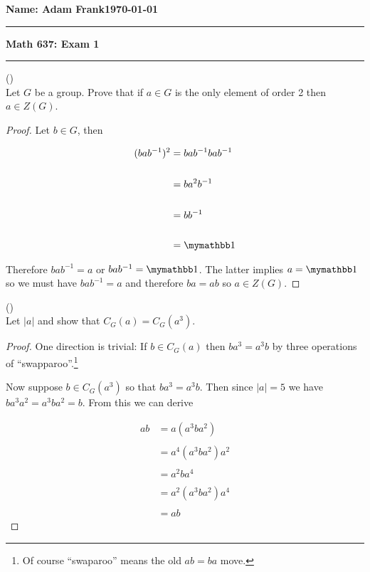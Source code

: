\documentclass{exam}
\begin{document}
\noindent \textbf{Name: Adam Frank}\hfill \textbf{\today}

\vspace{.3cm}
\hrule
\begin{center}
{\bf \Large{Math 637: Exam 1}}
\end{center}
\hrule
\vspace{.3cm}


\begin{questions}
\question()\\
Let $G$ be a group.  Prove that if $a\in G$ is the only element of order 2 then $a\in Z(G)$.

\begin{proof}
  Let $b\in G$, then

\begin{align*}
  (bab^{-1})^2 &= bab^{-1}bab^{-1} \\\\
  &= ba^2b^{-1} \\\\
  &= bb^{-1} \\\\
  &= \mymathbb 1
\end{align*}

Therefore $bab^{-1}=a$ or $bab^{-1}=\mymathbb 1$.  The latter implies $a=\mymathbb 1$ so we must have $bab^{-1}=a$ and therefore $ba=ab$ so $a\in Z(G)$.

\end{proof}

\vspace{1cm}

\question()\\
Let $|a|$ and show that $C_G(a)=C_G(a^3)$.

\begin{proof}
  One direction is trivial:  If $b\in C_G(a)$ then $ba^3 = a^3b$ by three operations of ``swapparoo''.\footnote{Of course ``swaparoo'' means the old $ab=ba$ move.}

  Now suppose $b\in C_G(a^3)$ so that $ba^3=a^3b$.  Then since $|a|=5$ we have $ba^3a^2=a^3ba^2=b$.  From this we can derive

  \begin{align*}
    ab &= a(a^3ba^2)\\\\
    &=a^4(a^3ba^2)a^2 \\\\
    &=a^2ba^4 \\\\
    &= a^2(a^3ba^2)a^4 \\\\
    &= ab
  \end{align*}
\end{proof}


\end{questions}
\end{document}
